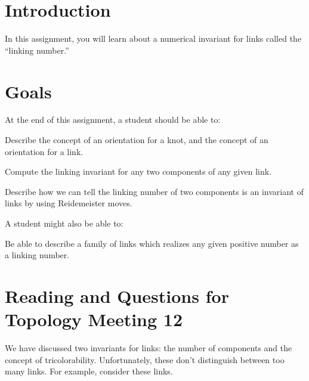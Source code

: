 \documentclass[12pt,letterpaper]{article}
\theoremstyle{definition}
\begin{document}
\setlength{\parskip}{1ex plus 0.5ex minus 0.2ex}
\setlength{\parindent}{0pt}

\pagestyle{fancy}
\cfoot{}

\section*{Introduction}
In this assignment, you will learn about a numerical invariant for links called the ``linking number.''

\section*{Goals}
At the end of this assignment, a student should be able to:
\begin{compactitem}
\item Describe the concept of an orientation for a knot, and the concept of an orientation for a link.
\item Compute the linking invariant for any two components of any given link.
\item Describe how we can tell the linking number of two components is an invariant of links by using Reidemeister moves.
\end{compactitem}
A student might also be able to:
\begin{compactitem}
\item Be able to describe a family of links which realizes any given positive number as a linking number.
\end{compactitem}

\section*{Reading and Questions for Topology Meeting 12}

We have discussed two invariants for links: the number of components and the concept of tricolorability. 
Unfortunately, these don't distinguish between too many links. For example, consider these links.
\end{document}
